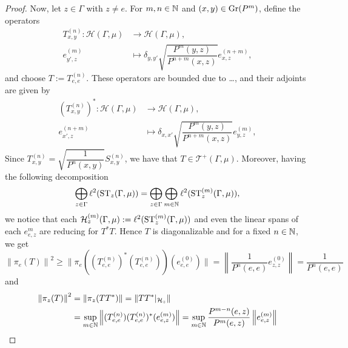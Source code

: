 \documentclass[12pt, class = article, crop = false, a4paper, twoside]{standalone}
\begin{document}
\begin{proof}
    Now, let $z\in\Gamma$ with $z\neq e$. For $m, n\in\mathbb{N}$ and $(x, y)\in\operatorname{Gr}(P^{m})$, define the operators
    \begin{equation*}
        \begin{split}
            T^{(n)}_{x, y}\colon \mathcal{H}(\Gamma, \mu) & \to \mathcal{H}(\Gamma, \mu), \\
            e^{(m)}_{y', z} & \mapsto \delta_{y, y'}\sqrt{\dfrac{P^{m}(y, z)}{P^{n + m}(x, z)}}e^{(n + m)}_{x, z},
        \end{split}
    \end{equation*}
    and choose $T := T^{(n)}_{e, e}$. These operators are bounded due to \dots, and their adjoints are given by
    \begin{equation*}
        \begin{split}
            (T^{(n)}_{x, y})^{\ast}\colon \mathcal{H}(\Gamma, \mu) & \to \mathcal{H}(\Gamma, \mu), \\
                e^{(n + m)}_{x', z} & \mapsto \delta_{x, x'}\sqrt{\dfrac{P^{m}(y, z)}{P^{n + m}(x, z)}}e^{(m)}_{y, z},
        \end{split}
    \end{equation*}
    Since $T^{(n)}_{x, y} = \sqrt{\dfrac{1}{P^{n}(x, y)}}S^{(n)}_{x, y}$, we have that $T\in\mathcal{T}^{+}(\Gamma, \mu)$. Moreover, having the following decomposition
    \begin{equation*}
        \bigoplus_{z\in\Gamma}\ell^{2}(\operatorname{ST}_{z}(\Gamma, \mu)) = \bigoplus_{z\in\Gamma}\bigoplus_{m\in\mathbb{N}}\ell^{2}(\operatorname{ST}^{(m)}_{z}(\Gamma, \mu)),
    \end{equation*}
    we notice that each $\mathcal{H}^{(m)}_{z}(\Gamma, \mu) := \ell^{2}(\operatorname{ST}^{(m)}_{z}(\Gamma, \mu))$ and even the linear spans of each $e^{m}_{e, z}$ are reducing for $T^{\ast}T$. Hence $T$ is diagonalizable and for a fixed $n\in\mathbb{N}$, we get
    \begin{equation*}
        \left\|\pi_{e}(T)\right\|^{2} \geq \|\pi_{e}((T^{(n)}_{e, e})^{\ast}(T^{(n)}_{e, e}))(e^{(0)}_{e, e})\| = \left\|\dfrac{1}{P^{n}(e, e)}e^{(0)}_{z, z}\right\| = \dfrac{1}{P^{n}(e, e)}
    \end{equation*}
    and
    \begin{equation*}
        \begin{split}
            \left\|\pi_{z}(T)\right\|^{2} & = \|\pi_{z}(TT^{\ast})\| = \left\|TT^{\ast}|_{\mathcal{H}_{z}}\right\| \\
            & = \sup_{m\in\N}\left\|(T^{(n)}_{e, e})(T^{(n)}_{e, e})^{\ast}(e^{(m)}_{e, z})\right\| = \sup_{m\in\N}\dfrac{P^{m - n}(e, z)}{P^{m}(e, z)}\left\|e^{(m)}_{e, z}\right\| \\

\end{split}
\end{equation*}
\end{proof}
\end{document}
